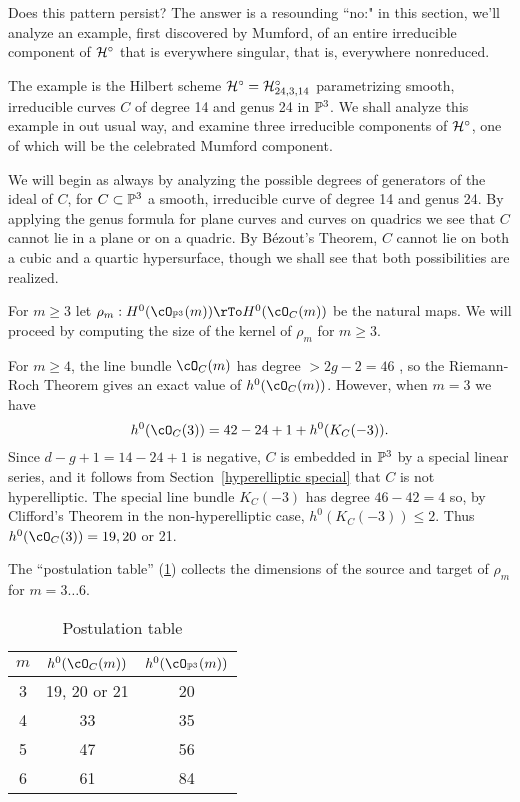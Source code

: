 Does this pattern persist? The answer is a resounding ``no:" in this section, we'll analyze an example, first discovered by Mumford, of an entire irreducible component of $\cH^\circ$ that is everywhere singular, that is, everywhere nonreduced.


The example is the  Hilbert scheme
$\cH^\circ = \cH^\circ_{24,3,14}$ parametrizing smooth, irreducible curves $C$ of degree 14 and genus 24 in $\PP^3$. We shall analyze this example in out usual way, and examine three irreducible components of $\cH^\circ$, one of which will be the celebrated Mumford component. 

We will begin as always by analyzing the possible degrees of generators of the ideal of $C$, for $C \subset \PP^3$ a smooth, irreducible curve of degree 14 and genus 24. By applying the genus formula for plane curves and curves on quadrics we see that $C$ cannot lie in a plane or on a quadric. By B\'ezout's Theorem, $C$ cannot lie on both a cubic and a quartic hypersurface, though we shall see that both possibilities are realized.

For $m\geq 3$ let
$
\rho_m : H^0(\cO_{\PP^3}(m)) \rTo H^0(\cO_C(m))
$
be the natural maps.
We will proceed by computing the size of the kernel of $\rho_m$ for $m\geq 3$.

For $m \geq 4$, the line bundle $\cO_C(m)$ has degree $>2g-2 = 46$ , so the Riemann-Roch Theorem gives an exact value of $h^0(\cO_C(m))$.
However, when $m= 3$ we have 
$$
h^0(\cO_C(3)) = 42-24+1+h^0(K_C(-3)).
$$
Since $d-g+1 = 14-24+1$ is negative, $C$ is embedded in $\PP^3$ by a special linear series, and it follows from Section~\ref{hyperelliptic special} that $C$ is not hyperelliptic. The special line bundle $K_C(-3)$ has degree $46-42 = 4$ so,
by Clifford's Theorem in the non-hyperelliptic case, $h^0(K_C(-3)) \leq 2$. Thus $h^0(\cO_C(3)) = 19, 20$ or 21.

 The ``postulation table'' (\ref{postulation table})
collects the dimensions of the source and target of  $\rho_m$ for $m = 3\dots 6$. 
\begin{table}\label{postulation table}
\begin{center}\begin{tabular}{ c | c | c }
 $m$ & $h^0(\cO_C(m))$ & $h^0(\cO_{\PP^3}(m))$ \\
 \hline
 3 & 19, 20 or 21 & 20 \\
 4 & 33 & 35 \\
 5 & 47 & 56 \\
 6 & 61 & 84
\end{tabular}
\end{center}
\caption{Postulation table\label{postulation table}}
\end{table}

